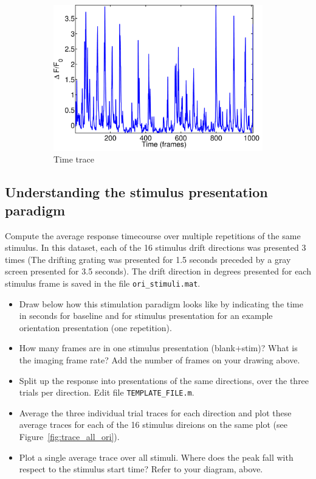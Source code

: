 \documentclass[paper=a4, fontsize=11pt]{scrartcl} %
\numberwithin{equation}{section} %
\numberwithin{figure}{section} %
\numberwithin{table}{section} %
\begin{document}
\begin{figure}
\begin{subfigure}[b]{0.3\textwidth}
    \includegraphics[width=\textwidth]{../MATLAB_complete/trace_delta_f_f0.pdf}
    \caption{Time trace}
    \label{fig:time_trace_dff0}
    \end{subfigure}
    
    \caption{}
\end{figure}

\subsection{Understanding the stimulus presentation paradigm}
Compute the average response timecourse over multiple repetitions of the same stimulus. In this dataset, each of the 16 stimulus drift directions was presented 3 times (The drifting grating was presented for 1.5 seconds preceded by a gray screen presented for 3.5 seconds). The drift direction in degrees presented for each stimulus frame is saved in the file \texttt{ori\_stimuli.mat}.

\begin{itemize}
\setlength{\parskip}{0.25em}
\item Draw below how this stimulation paradigm looks like by indicating the time in seconds for baseline and for stimulus presentation for an example orientation presentation (one repetition).\vspace{3in}
\item How many frames are in one stimulus presentation (blank+stim)? What is the imaging frame rate? Add the number of frames on your drawing above.
\item Split up the response into presentations of the same directions, over the three trials per direction. Edit file \texttt{TEMPLATE\_FILE.m}.
\item Average the three individual trial traces for each direction and plot these average traces for each of the 16 stimulus direions on the same plot (see Figure~\ref{fig:trace_all_ori}).
\item Plot a single average trace over all stimuli. Where does the peak fall with respect to the stimulus start time? Refer to your diagram, above.
\end{itemize}
\end{document}
